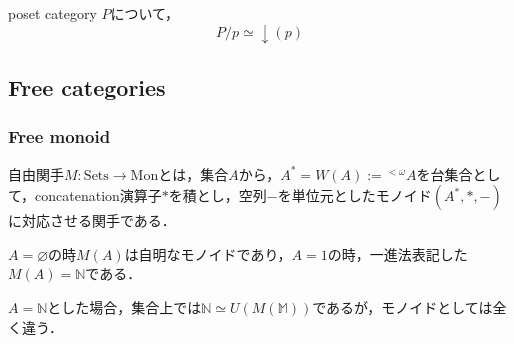 \documentclass[uplatex, dvipdfmx]{jsarticle}
\begin{document}
\begin{proposition*}
    poset category $P$について，
    \[ P/p \simeq \downarrow (p) \]
\end{proposition*}

\subsection{Free categories}

\subsubsection{Free monoid}

\begin{definition*}
    自由関手$M:\mathrm{Sets}\to\mathrm{Mon}$とは，集合$A$から，$A^*=W(A):={}^{<\omega}\!A$を台集合として，concatenation演算子$*$を積とし，空列$-$を単位元としたモノイド$(A^*,*,-)$に対応させる関手である．
\end{definition*}
\begin{remark*}
    $A=\varnothing$の時$M(A)$は自明なモノイドであり，$A=1$の時，一進法表記した$M(A)=\mathbb{N}$である．

    $A=\mathbb{N}$とした場合，集合上では$\mathbb{N}\simeq U(M(\mathbb{M}))$であるが，モノイドとしては全く違う．
\end{remark*}
\end{document}
